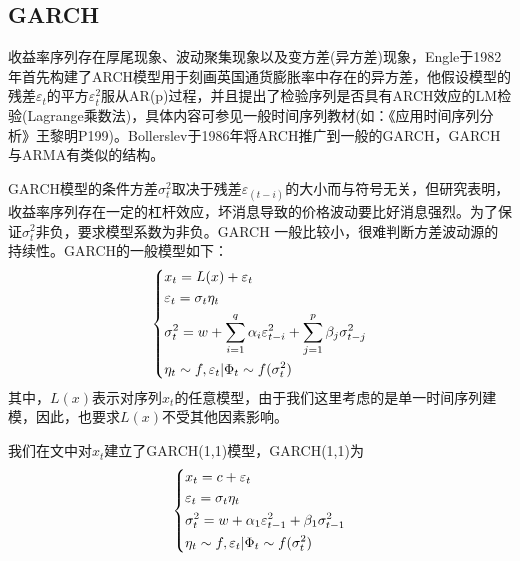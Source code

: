     \subsection{GARCH}
        收益率序列存在厚尾现象、波动聚集现象以及变方差(异方差)现象，Engle于1982年首先构建了ARCH模型用于刻画英国通货膨胀率中存在的异方差，他假设模型的残差$\varepsilon_t$的平方$\varepsilon_t^2$服从AR(p)过程，并且提出了检验序列是否具有ARCH效应的LM检验(Lagrange乘数法)，具体内容可参见一般时间序列教材(如：《应用时间序列分析》王黎明P199)。Bollerslev于1986年将ARCH推广到一般的GARCH，GARCH与ARMA有类似的结构。
        \par
        GARCH模型的条件方差$\sigma_t^2$取决于残差$\varepsilon _{(t-i)}$的大小而与符号无关，但研究表明，收益率序列存在一定的杠杆效应，坏消息导致的价格波动要比好消息强烈。为了保证$\sigma_t^2$非负，要求模型系数为非负。GARCH 一般比较小，很难判断方差波动源的持续性。GARCH的一般模型如下：
        \begin{equation*}
        \centering
        \left\{\begin{lgathered}
        {x_t} = L(x) + {\varepsilon _t}\\
        {\varepsilon _t} = {\sigma _t}{\eta _t}\\
        \sigma _t^2 = w + \sum\limits_{i = 1}^q {{\alpha _i}\varepsilon _{t - i}^2}  + \sum\limits_{j = 1}^p {{\beta _j}\sigma _{t - j}^2} \\
        {\eta _t} \sim f,{\varepsilon _t}|{\Phi _t} \sim f(\sigma _t^2)
        \end{lgathered} \right.
        \end{equation*}
        其中，$L(x)$表示对序列$x_t$的任意模型，由于我们这里考虑的是单一时间序列建模，因此，也要求$L(x)$不受其他因素影响。
        \par
        我们在文中对$x_t$建立了GARCH(1,1)模型，GARCH(1,1)为
        \begin{equation*}
        \centering
        \left\{\begin{lgathered}
        {x_t} = c + {\varepsilon _t}\\
        {\varepsilon _t} = {\sigma _t}{\eta _t}\\
        \sigma _t^2 = w + {\alpha _1}\varepsilon _{t - 1}^2 + {\beta _1}\sigma _{t - 1}^2\\
        {\eta _t} \sim f,{\varepsilon _t}|{\Phi _t} \sim f(\sigma _t^2)
        \end{lgathered} \right.
        \end{equation*}

